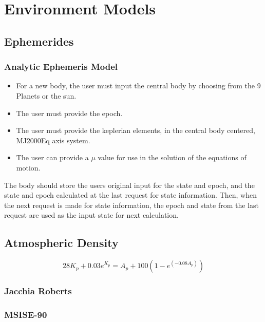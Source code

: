 \section{Environment Models}


\subsection{Ephemerides}

\subsubsection{Analytic Ephemeris Model}

\begin{itemize}
     \item For a new body, the user must input the central body by
     choosing from the 9 Planets or the sun.
     \item The user must provide the epoch.
     \item  The user must provide the keplerian elements, in the
     central body centered, MJ2000Eq axis system.
     \item  The user can provide a $\mu$ value for use in the
     solution of the equations of motion.
\end{itemize}

The body should store the users original input for the state and
epoch, and the state and epoch calculated at the last request for
state information. Then, when the next request is made for state
information, the epoch and state from the last request are used as
the input state for next calculation.

\subsection{Atmospheric Density}

\begin{equation}
28K_p + 0.03e^{K_p} = A_p + 100\left(1 - e^{(-0.08A_p)}\right)
\end{equation}

\subsubsection{Jacchia Roberts}

\subsubsection{MSISE-90}

